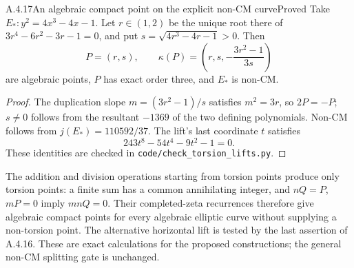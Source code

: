 \begin{result}{A.4.17}{An algebraic compact point on the explicit non-CM curve}{Proved}
Take $E_*:y^2=4x^3-4x-1$. Let $r\in(1,2)$ be the unique root there of $3r^4-6r^2-3r-1=0$, and put $s=\sqrt{4r^3-4r-1}>0$. Then
\[
 P=(r,s),\qquad
 \kappa(P)=\left(r,s,-\frac{3r^2-1}{3s}\right)
\]
are algebraic points, $P$ has exact order three, and $E_*$ is non-CM.
\end{result}
\begin{proof}
The duplication slope $m=(3r^2-1)/s$ satisfies $m^2=3r$, so $2P=-P$; $s\ne0$ follows from the resultant $-1369$ of the two defining polynomials. Non-CM follows from $j(E_*)=110592/37$. The lift's last coordinate $t$ satisfies
\[
 243t^8-54t^4-9t^2-1=0.
\]
These identities are checked in \texttt{code/check\_torsion\_lifts.py}.
\end{proof}

The addition and division operations starting from torsion points produce only torsion points: a finite sum has a common annihilating integer, and $nQ=P$, $mP=0$ imply $mnQ=0$. Their completed-zeta recurrences therefore give algebraic compact points for every algebraic elliptic curve without supplying a non-torsion point. The alternative horizontal lift is tested by the last assertion of A.4.16. These are exact calculations for the proposed constructions; the general non-CM splitting gate is unchanged.

